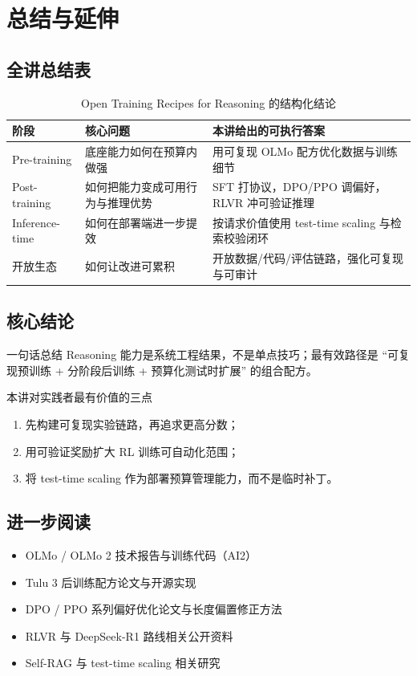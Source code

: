 \section{总结与延伸}

\subsection{全讲总结表}
\begin{table}[H]
\centering
\renewcommand{\arraystretch}{1.2}
\begin{tabular}{p{2.7cm}p{3.9cm}p{4.2cm}}
\toprule
\textbf{阶段} & \textbf{核心问题} & \textbf{本讲给出的可执行答案} \\
\midrule
Pre-training & 底座能力如何在预算内做强 & 用可复现 OLMo 配方优化数据与训练细节 \\
Post-training & 如何把能力变成可用行为与推理优势 & SFT 打协议，DPO/PPO 调偏好，RLVR 冲可验证推理 \\
Inference-time & 如何在部署端进一步提效 & 按请求价值使用 test-time scaling 与检索校验闭环 \\
开放生态 & 如何让改进可累积 & 开放数据/代码/评估链路，强化可复现与可审计 \\
\bottomrule
\end{tabular}
\caption{Open Training Recipes for Reasoning 的结构化结论}
\end{table}

\subsection{核心结论}
\begin{importantbox}{一句话总结}
Reasoning 能力是系统工程结果，不是单点技巧；最有效路径是 ``可复现预训练 + 分阶段后训练 + 预算化测试时扩展'' 的组合配方。
\end{importantbox}

\begin{knowledgebox}{本讲对实践者最有价值的三点}
\begin{enumerate}
    \item 先构建可复现实验链路，再追求更高分数；
    \item 用可验证奖励扩大 RL 训练可自动化范围；
    \item 将 test-time scaling 作为部署预算管理能力，而不是临时补丁。
\end{enumerate}
\end{knowledgebox}

\subsection{进一步阅读}
\begin{itemize}
    \item OLMo / OLMo 2 技术报告与训练代码（AI2）
    \item Tulu 3 后训练配方论文与开源实现
    \item DPO / PPO 系列偏好优化论文与长度偏置修正方法
    \item RLVR 与 DeepSeek-R1 路线相关公开资料
    \item Self-RAG 与 test-time scaling 相关研究
\end{itemize}


